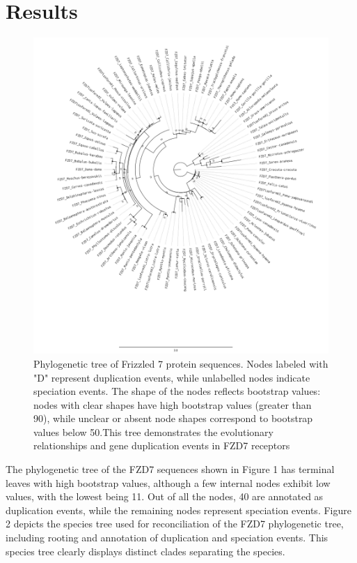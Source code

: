 \documentclass[11pt, a4paper]{article}
\begin{document}
\section{Results}
\begin{figure}[H]
    \centering
    \includegraphics[width=\linewidth]{Figures/FZDZ-seq.aln.contree.png} 
    \caption{Phylogenetic tree of Frizzled 7 protein sequences. Nodes labeled with "D" represent duplication events, while unlabelled nodes indicate speciation events. The shape of the nodes reflects bootstrap values: nodes with clear shapes have high bootstrap values (greater than 90), while unclear or absent node shapes correspond to bootstrap values below 50.This tree demonstrates the evolutionary relationships and gene duplication events in FZD7 receptors}
    \label{figure1-FZD7-tree}
\end{figure}
The phylogenetic tree of the FZD7 sequences shown in Figure 1 has terminal leaves with high bootstrap values, although a few internal nodes exhibit low values, with the lowest being 11. Out of all the nodes, 40 are annotated as duplication events, while the remaining nodes represent speciation events. Figure 2 depicts the species tree used for reconciliation of the FZD7 phylogenetic tree, including rooting and annotation of duplication and speciation events. This species tree clearly displays distinct clades separating the species.
\end{document}
